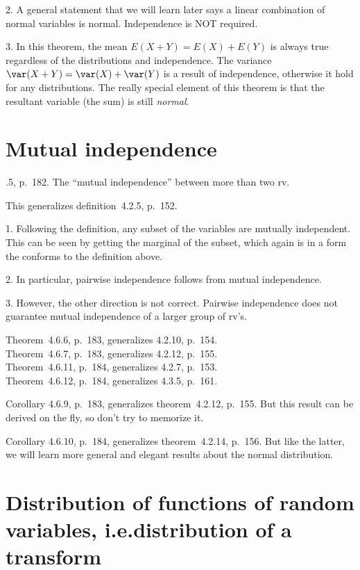 \documentclass[12pt]{article}
\begin{document}
2. A general statement that we will learn later says
a linear combination of normal variables is normal.
Independence is NOT required.

3. In this theorem,
the mean $E(X + Y) = E(X) + E(Y)$ is always true regardless of the
distributions and independence.
The variance $\var(X + Y) = \var(X) + \var(Y)$ is a result of
independence, otherwise it hold for any distributions.
The really special element of this theorem is that the resultant
variable (the sum) is still \emph{normal}.



\section{Mutual independence}


.5, p.~182.
The ``mutual independence'' between more than two rv.

This generalizes definition~4.2.5, p.~152.

\alert
1. Following the definition,
any subset of the variables are mutually independent.
This can be seen by getting the marginal of the subset,
which again is in a form the conforms to the definition above.

2. In particular, pairwise independence follows from mutual
independence.

3. However, the other direction is not correct.
Pairwise independence does not guarantee mutual independence of a larger
group of rv's.


\alert[Generalization]%
Theorem~4.6.6, p.~183, generalizes 4.2.10, p.~154.\\
Theorem~4.6.7, p.~183, generalizes 4.2.12, p.~155.\\
Theorem~4.6.11, p.~184, generalizes 4.2.7, p.~153.\\
Theorem~4.6.12, p.~184, generalizes 4.3.5, p.~161.

\alert[Generalization]%
Corollary 4.6.9, p.~183, generalizes theorem~4.2.12, p.~155.
But this result can be derived on the fly,
so don't try to memorize it.

\alert[Generalization]%
Corollary 4.6.10, p.~184, generalizes theorem~4.2.14, p.~156.
But like the latter, we will learn more general and elegant results
about the normal distribution.


\section{Distribution of functions of random variables,
i.e.\@ distribution of a transform}
\end{document}
